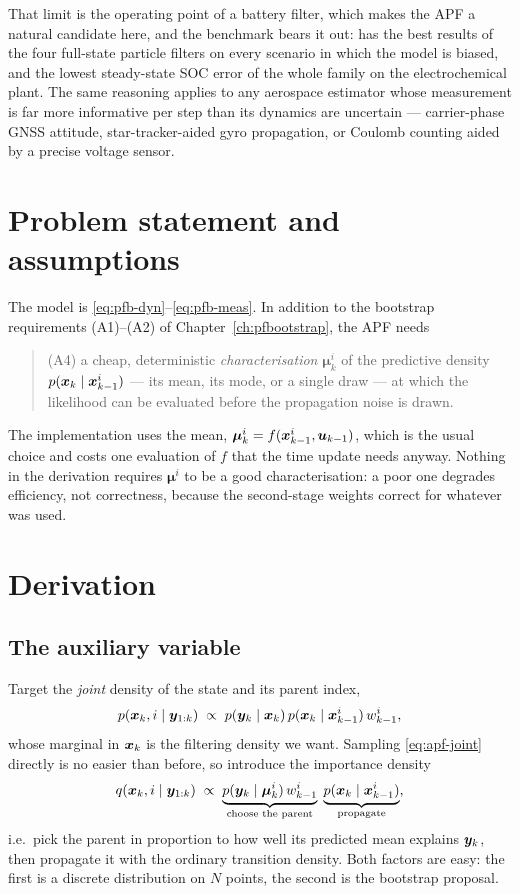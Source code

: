 That limit is the operating point of a battery filter, which makes the APF a natural candidate
here, and the benchmark bears it out:  has the best results of the four
full-state particle filters on every scenario in which the model is biased, and the lowest
steady-state SOC error of the whole family on the electrochemical plant.  The same reasoning applies to any aerospace estimator whose
measurement is far more informative per step than its dynamics are uncertain --- carrier-phase GNSS
attitude, star-tracker-aided gyro propagation, or Coulomb counting aided by a precise voltage
sensor.

\section{Problem statement and assumptions}
The model is \eqref{eq:pfb-dyn}--\eqref{eq:pfb-meas}.  In addition to the bootstrap requirements
(A1)--(A2) of Chapter~\ref{ch:pfbootstrap}, the APF needs
\begin{quote}
(A4) a cheap, deterministic \emph{characterisation} $\bm{\mu}_k^i$ of the predictive density
$p(\bm{x}_k\mid\bm{x}_{k-1}^i)$ --- its mean, its mode, or a single draw --- at which the likelihood can
be evaluated before the propagation noise is drawn.
\end{quote}
The implementation uses the mean, $\bm{\mu}_k^i = f(\bm{x}_{k-1}^i, \bm{u}_{k-1})$, which is the usual
choice \cite[eq.~(67)]{arulampalam2002} and costs one evaluation of $f$ that the time update needs
anyway.  Nothing in the derivation requires $\bm{\mu}^i$ to be a good characterisation: a poor one
degrades efficiency, not correctness, because the second-stage weights correct for whatever was
used.

\section{Derivation}

\subsection{The auxiliary variable}
Target the \emph{joint} density of the state and its parent index,
\begin{equation}
  p(\bm{x}_k, i \mid \bm{y}_{1:k}) \;\propto\; p(\bm{y}_k \mid \bm{x}_k)\, p(\bm{x}_k \mid \bm{x}_{k-1}^i)\, w_{k-1}^i ,
  \label{eq:apf-joint}
\end{equation}
whose marginal in $\bm{x}_k$ is the filtering density we want.  Sampling \eqref{eq:apf-joint}
directly is no easier than before, so introduce the importance density
\begin{equation}
  q(\bm{x}_k, i \mid \bm{y}_{1:k}) \;\propto\; \underbrace{p(\bm{y}_k\mid\bm{\mu}_k^i)\, w_{k-1}^i}_{\text{choose the parent}}
                                          \;\underbrace{p(\bm{x}_k\mid\bm{x}_{k-1}^i)}_{\text{propagate}} ,
  \label{eq:apf-q}
\end{equation}
i.e.\ pick the parent in proportion to how well its predicted mean explains $\bm{y}_k$, then propagate
it with the ordinary transition density.  Both factors are easy: the first is a discrete
distribution on $N$ points, the second is the bootstrap proposal.


